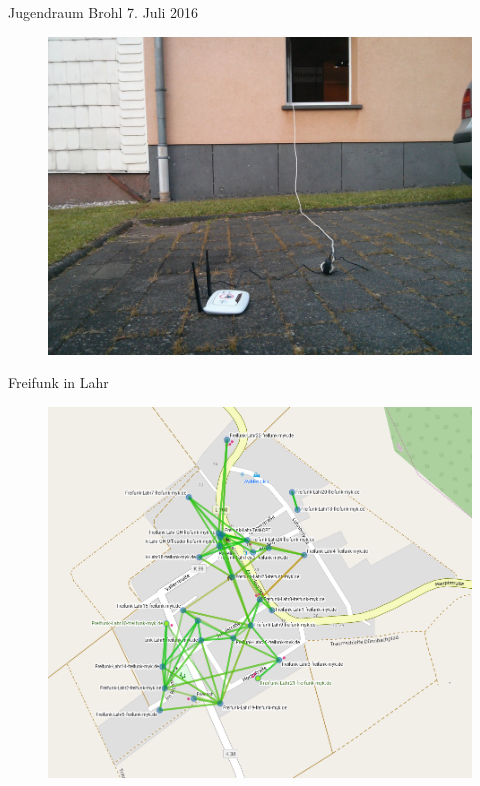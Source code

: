 \documentclass{beamer}
\begin{document}
\begin{frame}{Jugendraum Brohl 7. Juli 2016}
\begin{figure} 
\centering
\includegraphics[width=0.8\linewidth]{Bilder/Brohl2016-7-7}
\label{fig:brohl-7}
\end{figure}
\end{frame}



\begin{frame}{Freifunk in Lahr}

\begin{figure}
	\centering
	\includegraphics[width=0.7\linewidth]{Bilder/Lahr}
	\label{fig:lahr}
\end{figure}

\end{frame}
\end{document}
